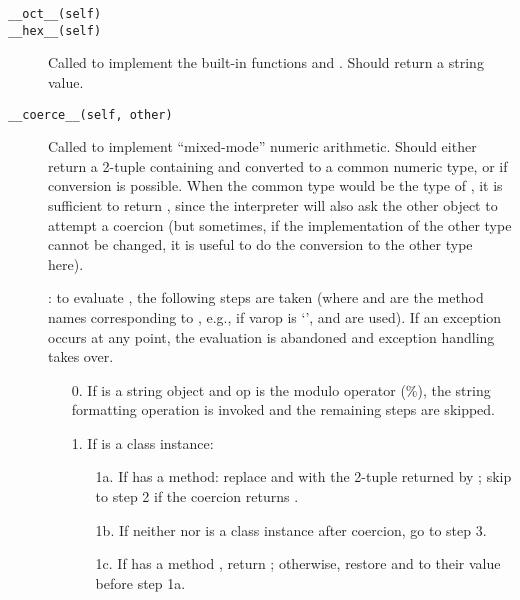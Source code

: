 \begin{description}
\item[{\tt __oct__(self)}]\itemjoin
\item[{\tt __hex__(self)}]\itembreak
Called to implement the built-in functions  and
.  Should return a string value.

\item[{\tt __coerce__(self, other)}]
Called to implement ``mixed-mode'' numeric arithmetic.  Should either
return a 2-tuple containing  and  converted to
a common numeric type, or  if conversion is possible.  When
the common type would be the type of , it is sufficient to
return , since the interpreter will also ask the other
object to attempt a coercion (but sometimes, if the implementation of
the other type cannot be changed, it is useful to do the conversion to
the other type here).

: to evaluate   , the
following steps are taken (where  and
 are the method names corresponding to ,
e.g., if var{op} is `\code{+}',  and
 are used).  If an exception occurs at any point,
the evaluation is abandoned and exception handling takes over.

\begin{itemize}

\item[0.] If  is a string object and op is the modulo operator (\%),
the string formatting operation is invoked and the remaining steps are
skipped.

\item[1.] If  is a class instance:

	\begin{itemize}

	\item[1a.] If  has a  method:
	replace  and  with the 2-tuple returned by
	; skip to step 2 if the
	coercion returns .

	\item[1b.] If neither  nor  is a class instance
	after coercion, go to step 3.

	\item[1c.] If  has a method , return
	; otherwise, restore  and
	 to their value before step 1a.


\end{itemize}
\end{itemize}
\end{description}
